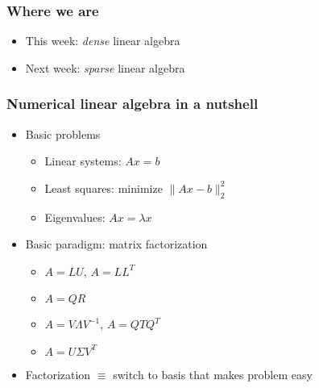 \documentclass{beamer}
\begin{document}
\begin{frame}
  \titlepage
\end{frame}


\begin{frame}
  \frametitle{Where we are}

  \begin{itemize}
  \item This week: {\em dense} linear algebra
  \item Next week: {\em sparse} linear algebra
  \end{itemize}
  
\end{frame}


\begin{frame}
  \frametitle{Numerical linear algebra in a nutshell}

  \begin{itemize}
  \item Basic problems
    \begin{itemize}
    \item Linear systems: $Ax = b$
    \item Least squares: minimize $\|Ax-b\|_2^2$
    \item Eigenvalues: $Ax = \lambda x$
    \end{itemize}
  \item Basic paradigm: matrix factorization
    \begin{itemize}
    \item $A = LU$, $A = LL^T$
    \item $A = QR$
    \item $A = V \Lambda V^{-1}$, $A = Q T Q^T$
    \item $A = U \Sigma V^T$
    \end{itemize}
  \item Factorization $\equiv$ switch to basis that makes problem easy
  \end{itemize}

\end{frame}
\end{document}
